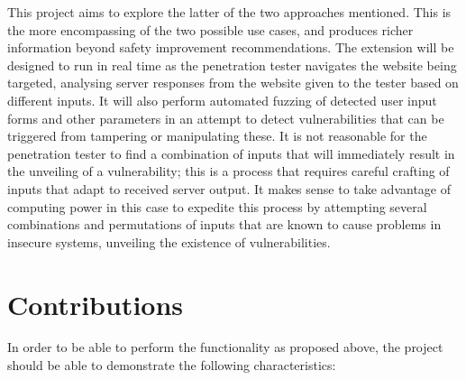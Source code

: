 This project aims to explore the latter of the two approaches mentioned. 
This is the more encompassing of the two possible use cases, and produces richer information beyond safety improvement recommendations. 
The extension will be designed to run in real time as the penetration tester navigates the website being targeted, analysing server responses from the website given to the tester based on different inputs. 
It will also perform automated fuzzing of detected user input forms and other parameters in an attempt to detect vulnerabilities that can be triggered from tampering or manipulating these.
It is not reasonable for the penetration tester to find a combination of inputs that will immediately result in the unveiling of a vulnerability; this is a process that requires careful crafting of inputs that adapt to received server output.
It makes sense to take advantage of computing power in this case to expedite this process by attempting several combinations and permutations of inputs that are known to cause problems in insecure systems, unveiling the existence of vulnerabilities.



\section{Contributions}

%
In order to be able to perform the functionality as proposed above, the project should be able to demonstrate the following characteristics:

